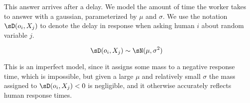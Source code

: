 This answer arrives after a delay.
 We model the amount of time the worker takes to answer with a gaussian, parameterized by $\mu$ and $\sigma$.
 We use the notation $\sD(o_i, X_j)$ to denote the delay in response when asking human $i$ about random variable $j$.

\[\sD(o_i, X_j) \sim \sN(\mu, \sigma^2)\]

This is an imperfect model, since it assigns some mass to a negative response time, which is impossible, but given a large $\mu$ and relatively small $\sigma$ the mass assigned to $\sD(o_i, X_j) < 0$ is negligible, and it otherwise accurately reflects human response times.
